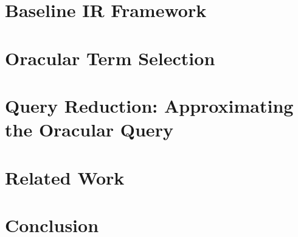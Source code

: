 \documentclass{sig-alternate}
\begin{document}
\section{Baseline IR Framework}
\label{Sec:BaselineIRFramework}


\section{Oracular Term Selection}
\label{Sec:OracularTermSelection}


\section{Query Reduction: Approximating the Oracular Query}
\label{Sec:QueryReduction}


\section{Related Work}
\label{Sec:RelatedWork}


%
\section{Conclusion}
\label{Sec:Conclusion}


\end{document}
